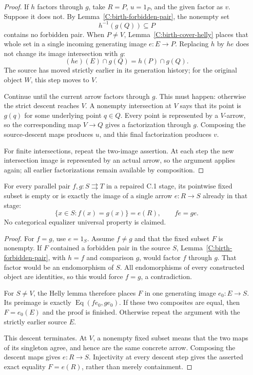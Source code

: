 \begin{proof}
If $h$ factors through $g$, take $R=P$, $u=1_P$, and the given
factor as $v$.  Suppose it does not.  By
Lemma~\ref{C:birth-forbidden-pair}, the nonempty set
\[
                           h^{-1}(g(Q))\subseteq P
\]
contains no forbidden pair.  When $P\ne V$,
Lemma~\ref{C:birth-cover-helly} places that whole set in a single
incoming generating image $e:E\to P$.  Replacing $h$ by $he$
does not change its image intersection with $g$:
\[
                        (he)(E)\cap g(Q)=h(P)\cap g(Q).
\]
The source has moved strictly earlier in its generation history;
for the original object $W$, this step moves to $V$.

Continue until the current arrow factors through $g$.  This must
happen: otherwise the strict descent reaches $V$.  A nonempty
intersection at $V$ says that its point is $g(q)$ for some
underlying point $q\in Q$.  Every point is represented by a
$V$-arrow, so the corresponding map $V\to Q$ gives a
factorization through $g$.  Composing the source-descent maps
produces $u$, and this final factorization produces $v$.

For finite intersections, repeat the two-image assertion.  At
each step the new intersection image is represented by an actual
arrow, so the argument applies again; all earlier factorizations
remain available by composition.
\end{proof}

\begin{proposition}
\label{C:point-equalizer-image}
For every parallel pair $f,g:S\rightrightarrows T$ in a repaired
C.1 stage, its pointwise fixed subset is empty or is exactly the
image of a single arrow $e:R\to S$ already in that stage:
\[
                  \{x\in S:f(x)=g(x)\}=e(R),\qquad fe=ge.
\]
No categorical equalizer universal property is claimed.
\end{proposition}

\begin{proof}
For $f=g$, use $e=1_S$.  Assume $f\ne g$ and that the fixed subset
$F$ is nonempty.  If $F$ contained a forbidden pair in the source
$S$, Lemma~\ref{C:birth-forbidden-pair}, with $h=f$ and comparison
$g$, would factor $f$ through $g$.  That factor would be an
endomorphism of $S$.  All endomorphisms of every constructed
object are identities, so this would force $f=g$, a contradiction.

For $S\ne V$, the Helly lemma therefore places $F$ in one
generating image $e_0:E\to S$.  Its preimage is exactly
$\operatorname{Eq}(fe_0,ge_0)$.  If these two composites are equal,
then $F=e_0(E)$ and the proof is finished.  Otherwise repeat the
argument with the strictly earlier source $E$.

This descent terminates.  At $V$, a nonempty fixed subset means
that the two maps of its singleton agree, and hence are the same
concrete arrow.  Composing the descent maps gives $e:R\to S$.
Injectivity at every descent step gives the asserted exact
equality $F=e(R)$, rather than merely containment.
\end{proof}

